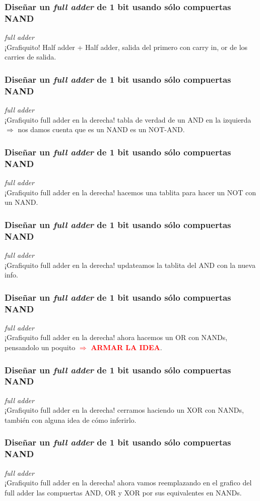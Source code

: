 \documentclass[hyperref={pdfpagelabels=false}]{beamer}
\begin{document}
\begin{frame}
\frametitle{Diseñar un \textit{full adder} de 1 bit usando sólo compuertas
NAND}
\textit{full adder}
\\ ¡Grafiquito! Half adder + Half adder, salida del primero con carry in, or
de los carries de salida.
\end{frame}


\begin{frame}
\frametitle{Diseñar un \textit{full adder} de 1 bit usando sólo compuertas
NAND}
\textit{full adder}
\\ ¡Grafiquito full adder en la derecha! tabla de verdad de un AND en la
izquierda $\Rightarrow$ nos damos cuenta que es un NAND es un NOT-AND.
\end{frame}


\begin{frame}
\frametitle{Diseñar un \textit{full adder} de 1 bit usando sólo compuertas
NAND}
\textit{full adder}
\\ ¡Grafiquito full adder en la derecha! hacemos una tablita para hacer un
NOT con un NAND.
\end{frame}


\begin{frame}
\frametitle{Diseñar un \textit{full adder} de 1 bit usando sólo compuertas
NAND}
\textit{full adder}
\\ ¡Grafiquito full adder en la derecha! updateamos la tablita del AND con
la nueva info.
\end{frame}


\begin{frame}
\frametitle{Diseñar un \textit{full adder} de 1 bit usando sólo compuertas
NAND}
\textit{full adder}
\\ ¡Grafiquito full adder en la derecha! ahora hacemos un OR con NANDs,
pensandolo un poquito \textcolor{red}{$\Rightarrow$ \textbf{ARMAR LA IDEA}}.
\end{frame}


\begin{frame}
\frametitle{Diseñar un \textit{full adder} de 1 bit usando sólo compuertas
NAND}
\textit{full adder}
\\ ¡Grafiquito full adder en la derecha! cerramos haciendo un XOR con NANDs,
también con alguna idea de cómo inferirlo.
\end{frame}


\begin{frame}
\frametitle{Diseñar un \textit{full adder} de 1 bit usando sólo compuertas
NAND}
\textit{full adder}
\\ ¡Grafiquito full adder en la derecha! ahora vamos reemplazando en el
grafico del full adder las compuertas AND, OR y XOR por sus equivalentes en
NANDs.
\end{frame}
\end{document}
